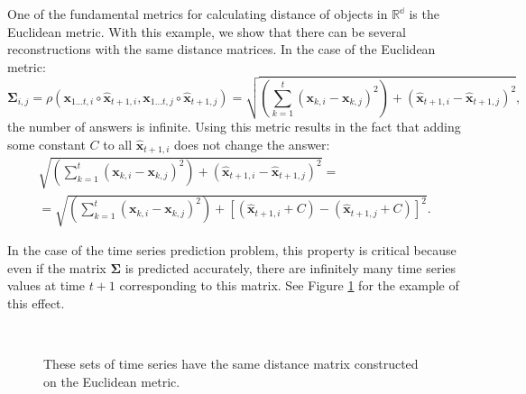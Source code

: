 \documentclass[12pt]{article}
\begin{document}
One of the fundamental metrics for calculating distance of objects in $\mathbb{R^d}$ is the Euclidean metric. With this example, we show that there can be several reconstructions with the same distance matrices. In the case of the Euclidean metric:
\[\mathbf{\Sigma}_{i,j} = \rho(\mathbf{x}_{1 \ldots t, i} \circ \hat{\mathbf{x}}_{t+1, i}, \mathbf{x}_{1 \ldots t, j} \circ \hat{\mathbf{x}}_{t+1, j})=\sqrt{\left(\sum_{k=1}^t (\mathbf{x}_{k,i}-\mathbf{x}_{k,j})^2\right) + (\hat{\mathbf{x}}_{t+1, i}-\hat{\mathbf{x}}_{t+1, j})^2},\]
the number of answers is infinite.
Using this metric results in the fact that adding some constant $C$ to all $\hat{\mathbf{x}}_{t+1, i}$ does not change the answer:
\begin{gather*}
	\sqrt{\left(\sum_{k=1}^t (\mathbf{x}_{k,i}-\mathbf{x}_{k,j})^2\right) + (\hat{\mathbf{x}}_{t+1, i}-\hat{\mathbf{x}}_{t+1, j})^2} =\\
	= \sqrt{\left(\sum_{k=1}^t (\mathbf{x}_{k,i}-\mathbf{x}_{k,j})^2\right) + [(\hat{\mathbf{x}}_{t+1, i} + C) -(\hat{\mathbf{x}}_{t+1, j} + C)]^2}.
\end{gather*}

In the case of the time series prediction problem, this property is critical because even if the matrix $\mathbf{\Sigma}$ is predicted accurately, there are infinitely many time series values at time $t+1$ corresponding to this matrix. See Figure \ref{fig:fig1} for the example of this effect.
\begin{figure}[!htbp]
	\centering
	\\
	\caption{These sets of time series have the same distance matrix constructed on the Euclidean metric.}
	\label{fig:fig1}
\end{figure}
\end{document}
